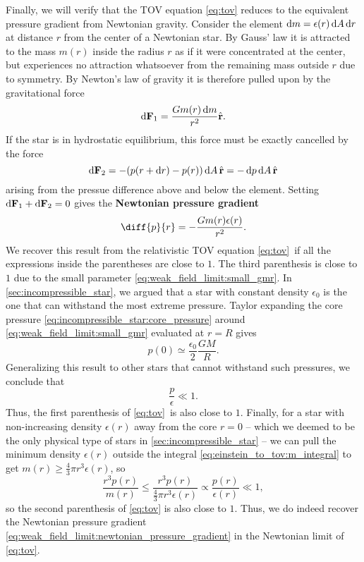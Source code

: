 Finally, we will verify that the TOV equation \eqref{eq:tov} reduces to the equivalent pressure gradient from Newtonian gravity.
Consider the element $\mathop{}\!\mathrm{d} m = \epsilon(r) \mathop{}\!\mathrm{d} A \mathop{}\!\mathrm{d} r$ at distance $r$ from the center of a Newtonian star.
By Gauss' law it is attracted to the mass $m(r)$ inside the radius $r$ as if it were concentrated at the center, but experiences no attraction whatsoever from the remaining mass outside $r$ due to symmetry.
By Newton's law of gravity it is therefore pulled upon by the gravitational force
\begin{equation}
	\mathop{}\!\mathrm{d} \mathbf{F}_1 = \frac{G m(r) \mathop{}\!\mathrm{d} m}{r^2} \hat{\textbf{r}} .
	\label{eq:weak_field_limit:force_newton}
\end{equation}
If the star is in hydrostatic equilibrium, this force must be exactly cancelled by the force
\begin{equation}
	\mathop{}\!\mathrm{d} \textbf{F}_2 = -(p(r + \mathop{}\!\mathrm{d} r) - p(r)) \mathop{}\!\mathrm{d} A \, \hat{\textbf{r}} = -\mathop{}\!\mathrm{d} p \mathop{}\!\mathrm{d} A \, \hat{\textbf{r}}
	\label{eq:weak_field_limit:force_pressure}
\end{equation}
arising from the pressue difference above and below the element.
Setting $\mathop{}\!\mathrm{d} \textbf{F}_1 + \mathop{}\!\mathrm{d} \textbf{F}_2 = 0$ gives the \textbf{Newtonian pressure gradient}
\begin{equation}
	\diff{p}{r} = -\frac{G m(r) \epsilon(r)}{r^2} .
	\label{eq:weak_field_limit:newtonian_pressure_gradient}
\end{equation}
We recover this result from the relativistic TOV equation \eqref{eq:tov} if all the expressions inside the parentheses are close to $1$.
The third parenthesis is close to $1$ due to the small parameter \eqref{eq:weak_field_limit:small_gmr}.
In \cref{sec:incompressible_star}, we argued that a star with constant density $\epsilon_0$ is the one that can withstand the most extreme pressure.
Taylor expanding the core pressure \eqref{eq:incompressible_star:core_pressure} around \eqref{eq:weak_field_limit:small_gmr} evaluated at $r=R$ gives
\begin{equation}
	p(0) \simeq \frac{\epsilon_0}{2} \frac{G M}{R}.
\end{equation}
Generalizing this result to other stars that cannot withstand such pressures, we conclude that
\begin{equation}
	\frac{p}{\epsilon} \ll 1 .
\end{equation}
Thus, the first parenthesis of \cref{eq:tov} is also close to $1$.
Finally, for a star with non-increasing density $\epsilon(r)$ away from the core $r=0$ -- which we deemed to be the only physical type of stars in \cref{sec:incompressible_star} -- we can pull the minimum density $\epsilon(r)$ outside the integral \eqref{eq:einstein_to_tov:m_integral} to get $m(r) \geq \frac{4}{3} \pi r^3 \epsilon(r)$, so
\begin{equation*}
	\frac{r^3 p(r)}{m(r)} \leq    \frac{r^3 p(r)}{\frac{4}{3} \pi r^3 \epsilon(r)}
	                      \propto \frac{p(r)}{\epsilon(r)}
						  \ll  1 ,
\end{equation*}
so the second parenthesis of \cref{eq:tov} is also close to $1$.
Thus, we do indeed recover the Newtonian pressure gradient \eqref{eq:weak_field_limit:newtonian_pressure_gradient} in the Newtonian limit of \cref{eq:tov}.
